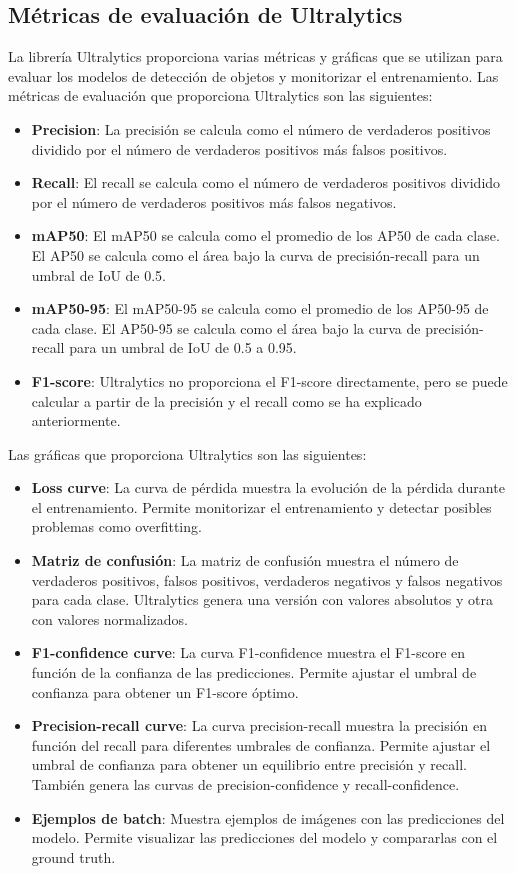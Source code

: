 \subsection{Métricas de evaluación de Ultralytics\label{SEC:METRICAS_ULTRALYTICS}}
La librería Ultralytics proporciona varias métricas y gráficas que se utilizan para evaluar los modelos de detección de objetos y monitorizar el entrenamiento. Las métricas de evaluación que proporciona Ultralytics son las siguientes:
\begin{itemize}
    \item \textbf{Precision}: La precisión se calcula como el número de verdaderos positivos dividido por el número de verdaderos positivos más falsos positivos.
    \item \textbf{Recall}: El recall se calcula como el número de verdaderos positivos dividido por el número de verdaderos positivos más falsos negativos.
    \item \textbf{mAP50}: El mAP50 se calcula como el promedio de los AP50 de cada clase. El AP50 se calcula como el área bajo la curva de precisión-recall para un umbral de IoU de 0.5.
    \item \textbf{mAP50-95}: El mAP50-95 se calcula como el promedio de los AP50-95 de cada clase. El AP50-95 se calcula como el área bajo la curva de precisión-recall para un umbral de IoU de 0.5 a 0.95.
    \item \textbf{F1-score}: Ultralytics no proporciona el F1-score directamente, pero se puede calcular a partir de la precisión y el recall como se ha explicado anteriormente.
\end{itemize}

Las gráficas que proporciona Ultralytics son las siguientes:

\begin{itemize}
    \item \textbf{Loss curve}: La curva de pérdida muestra la evolución de la pérdida durante el entrenamiento. Permite monitorizar el entrenamiento y detectar posibles problemas como overfitting.
    \item \textbf{Matriz de confusión}: La matriz de confusión muestra el número de verdaderos positivos, falsos positivos, verdaderos negativos y falsos negativos para cada clase. Ultralytics genera una versión con valores absolutos y otra con valores normalizados.
    \item \textbf{F1-confidence curve}: La curva F1-confidence muestra el F1-score en función de la confianza de las predicciones. Permite ajustar el umbral de confianza para obtener un F1-score óptimo.
    \item \textbf{Precision-recall curve}: La curva precision-recall muestra la precisión en función del recall para diferentes umbrales de confianza. Permite ajustar el umbral de confianza para obtener un equilibrio entre precisión y recall. También genera las curvas de precision-confidence y recall-confidence.
    \item \textbf{Ejemplos de batch}: Muestra ejemplos de imágenes con las predicciones del modelo. Permite visualizar las predicciones del modelo y compararlas con el ground truth.
\end{itemize}

